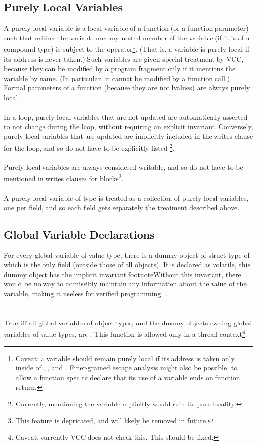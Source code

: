 \documentclass[preprint,nocopyrightspace]{sigplanconf}
\begin{document}
{{{\subsection{Purely Local Variables}
A purely local variable is a local variable of a function (or a
function parameter) such that neither the variable nor any nested
member of the variable (if it is of a compound type) is subject to
the \vcc{&} operator\footnote{Caveat:
a variable should remain purely local if its
address is taken only inside of , , and .
Finer-grained escape analysis might also be possible, to allow
a function spec to declare that its use of a variable ends on function return.
}. (That is, a variable is purely local if its
address is never taken.) Such variables are given special treatment
by VCC, because they can be modified by a program fragment only if it
mentions the variable by name. (In particular, it cannot be modified
by a function call.) Formal parameters of a function (because they are not
lvalues) are always purely local. 
\\\\
In a loop, purely local variables that are not updated are
automatically asserted to not change during the loop, without
requiring an explicit invariant. Conversely, purely local variables
that are updated are implicitly included in the writes clause for the
loop, and so do not have to be explicitly listed \footnote{Currently,
mentioning the variable explicitly would ruin its pure locality.
}.
\\\\
Purely local variables are always considered writable, and so do not
have to be mentioned in writes clauses for blocks\footnote{This
feature is depricated, and will likely be removed in future.}. 
\\\\
A purely local variable of  type is treated
as a collection of purely local variables, one per field, and so each
field gets separately the treatment described above.

\subsection{Global Variable Declarations}
For every global variable  of value type, there is a dummy object
of struct type of which  is the only field (outside those of
all objects). If  is declared as volatile, this dummy object has the implicit invariant
footnote{Without this invariant, there would be no way to admissibly
maintain any information about the value of the variable, making it
useless for verified programming.
}.
\\\\
\\
True iff all global variables of object types, and the dummy
objects owning global variables of value types,
are \vcc{\mutable}. This function is allowed only in a thread
context\footnote{
Caveat: currently VCC does not check this. This should be fixed.
}.

}}}
\end{document}
